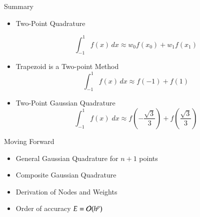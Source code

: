 \documentclass[10pt]{beamer}
\begin{document}
\begin{frame}{Summary}
\begin{itemize}

    \item Two-Point Quadrature 

    $$
        \int_{-1}^1 f(x)\,dx \approx w_0 f(x_0)+w_1f(x_1)
    $$
    
    \item Trapezoid is a Two-point Method
    $$
        \int_{-1}^1 f(x) \,dx \approx f(-1) + f(1)
    $$

    \item Two-Point Gaussian Quadrature 
    $$
          \int_{-1}^1 f(x) \; \mathit{dx} \approx f\left(-\frac{\sqrt{3}}{3}\right) + f\left(\frac{\sqrt{3}}{3} \right)
    $$


\end{itemize}
    
\end{frame}

\begin{frame}{Moving Forward}

\begin{itemize}

    \item General Gaussian Quadrature for $n+1$ points
    \vfill 
    \item Composite Gaussian Quadrature
    \vfill 
    \item Derivation of Nodes and Weights
    \vfill
    \item Order of accuracy $E={\mathcal{O}}(h^p)$
    \vfill 
\end{itemize}
    
\end{frame}
\end{document}
